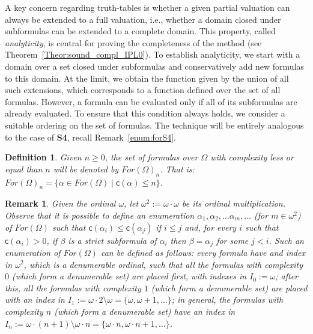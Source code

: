 \documentclass[12pt]{article}
\newtheorem{definition}[theorem]{Definition}
\newtheorem{remark}[theorem]{Remark}
\newcommand {\co} {\textsf{c}}
\begin{document}
A key concern regarding truth-tables is whether a given partial valuation can always be extended to a full valuation, i.e., whether a domain closed under subformulas can be extended to a complete domain. This property, called \emph{analyticity}, is central for proving the completeness of the method (see Theorem~\ref{Theor:sound_compl_IPL0}). To establish analyticity, we start with a domain over a set closed under subformulas and conservatively add new formulas to this domain. At the limit, we obtain the function given by the union of all such extensions, which corresponds to a function defined over the set of all formulas. However, a formula can be evaluated only if all of its subformulas are already evaluated. To ensure that this condition always holds, we consider a suitable ordering on the set of formulas. The technique will be entirely analogous to the case of \textbf{S4}, recall Remark~\ref{enum:forS4}.




\begin{definition}
Given $n \geq 0$, the set of formulas over $\Omega$ with complexity less or equal than $n$ will be denoted by $For(\Omega)_n$. That is:  $For(\Omega)_n = \{\alpha \in For(\Omega) \mid \co(\alpha) \leq n\}$.
\end{definition}


\begin{remark} \label{enum:forIPL} Given the ordinal $\omega$, let $\omega^2:=\omega\cdot \omega$ be its ordinal multiplication.
Observe that it is possible to define an enumeration  $\alpha_1,\alpha_2,\ldots \alpha_m, \ldots$ (for $m \in \omega^2$)  of $For(\Omega)$ such that $\co(\alpha_i) \leq \co(\alpha_j)$ if $i \leq j$ and, for every $i$ such that $\co(\alpha_i) >0$, if $\beta$ is a strict subformula of $\alpha_i$ then $\beta=\alpha_j$ for some $j < i$. Such an enumeration of $For(\Omega)$ can be defined as follows: every formula have and index in $\omega^2$, which is a denumerable ordinal, such that all the formulas with complexity $0$ (which form a denumerable set) are placed first, with indexes in $I_0:=\omega$; after this, all the formulas with complexity $1$ (which form a denumerable set) are placed with an index in $I_1:=\omega\cdot 2\setminus \omega=\{\omega,\omega + 1, \ldots\}$; in general, the formulas with complexity $n$ (which form a denumerable set) have an index in $I_{n}:=\omega\cdot(n+1)\setminus\omega\cdot n=\{\omega\cdot n, \omega\cdot n+1, \ldots\}$.
\end{remark}
\end{document}

